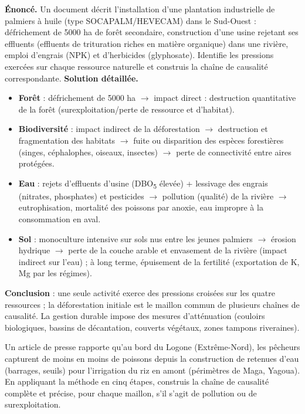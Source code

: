 \documentclass[11pt]{article}
\begin{document}
\begin{exoresolu}
\textbf{Énoncé.} Un document décrit l'installation d'une plantation industrielle de palmiers à huile (type SOCAPALM/HEVECAM) dans le Sud-Ouest : défrichement de \num{5000} ha de forêt secondaire, construction d'une usine rejetant ses effluents (effluents de trituration riches en matière organique) dans une rivière, emploi d'engrais (NPK) et d'herbicides (glyphosate). Identifie les pressions exercées sur chaque ressource naturelle et construis la chaîne de causalité correspondante.
\tcblower
\textbf{Solution détaillée.}
\begin{itemize}
  \item \textbf{Forêt} : défrichement de \num{5000} ha $\to$ impact direct : destruction quantitative de la forêt (surexploitation/perte de ressource et d'habitat).
  \item \textbf{Biodiversité} : impact indirect de la déforestation $\to$ destruction et fragmentation des habitats $\to$ fuite ou disparition des espèces forestières (singes, céphalophes, oiseaux, insectes) $\to$ perte de connectivité entre aires protégées.
  \item \textbf{Eau} : rejets d'effluents d'usine (DBO\textsubscript{5} élevée) + lessivage des engrais (nitrates, phosphates) et pesticides $\to$ pollution (qualité) de la rivière $\to$ eutrophisation, mortalité des poissons par anoxie, eau impropre à la consommation en aval.
  \item \textbf{Sol} : monoculture intensive sur sols nus entre les jeunes palmiers $\to$ érosion hydrique $\to$ perte de la couche arable et envasement de la rivière (impact indirect sur l'eau) ; à long terme, épuisement de la fertilité (exportation de K, Mg par les régimes).
\end{itemize}
\textbf{Conclusion} : une seule activité exerce des pressions croisées sur les quatre ressources ; la déforestation initiale est le maillon commun de plusieurs chaînes de causalité. La gestion durable impose des mesures d'atténuation (couloirs biologiques, bassins de décantation, couverts végétaux, zones tampons riveraines).
\end{exoresolu}

\begin{exercice}
Un article de presse rapporte qu'au bord du Logone (Extrême-Nord), les pêcheurs capturent de moins en moins de poissons depuis la construction de retenues d'eau (barrages, seuils) pour l'irrigation du riz en amont (périmètres de Maga, Yagoua). En appliquant la méthode en cinq étapes, construis la chaîne de causalité complète et précise, pour chaque maillon, s'il s'agit de pollution ou de surexploitation.
\end{exercice}
\end{document}
